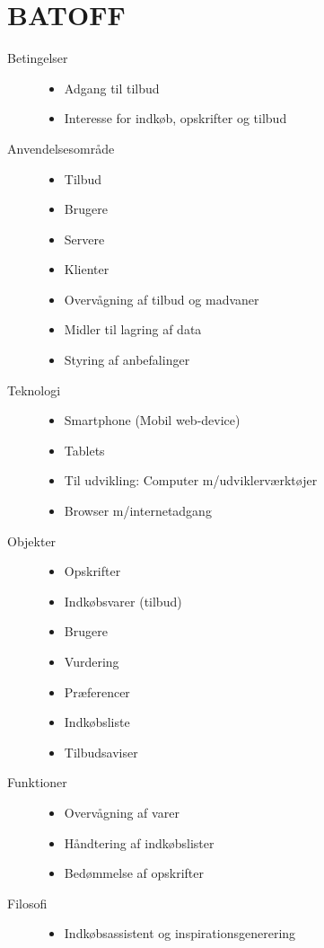 \section{BATOFF}
\begin{description}
\item [Betingelser]\hfill
\begin{itemize}[nolistsep,noitemsep]
\item Adgang til tilbud
\item Interesse for indkøb, opskrifter og tilbud
\end{itemize}

\item [Anvendelsesområde]\hfill
\begin{itemize}[nolistsep,noitemsep]
\item Tilbud
\item Brugere
\item Servere
\item Klienter
\item Overvågning af tilbud og madvaner
\item Midler til lagring af data
\item Styring af anbefalinger
\end{itemize}

\item [Teknologi]\hfill
\begin{itemize}[nolistsep,noitemsep]
\item Smartphone (Mobil web-device)
\item Tablets
\item Til udvikling: Computer m/udviklerværktøjer
\item Browser m/internetadgang
\end{itemize}

\item [Objekter]\hfill
\begin{itemize}[nolistsep,noitemsep]
\item Opskrifter
\item Indkøbsvarer (tilbud)
\item Brugere
\item Vurdering 
\item Præferencer
\item Indkøbsliste
\item Tilbudsaviser 
\end{itemize}

\item [Funktioner]\hfill
\begin{itemize}[nolistsep,noitemsep]
\item Overvågning af varer 
\item Håndtering af indkøbslister
\item Bedømmelse af opskrifter
\end{itemize}

\item [Filosofi]\hfill
\begin{itemize}[nolistsep,noitemsep]
\item Indkøbsassistent og inspirationsgenerering
\end{itemize}
\end{description}

 


